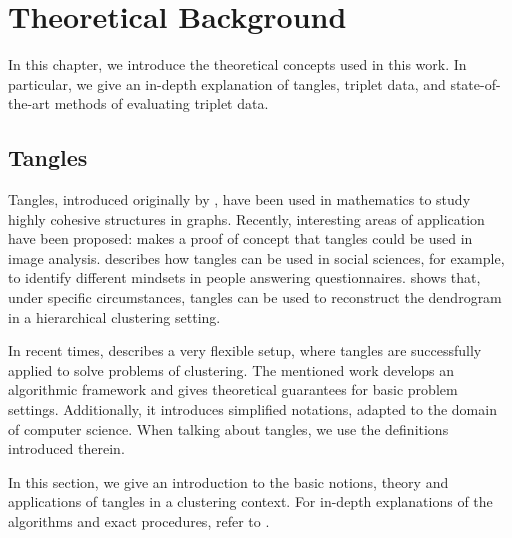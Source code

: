 \chapter{Theoretical Background}\label{theory}
In this chapter, we introduce the theoretical concepts used in this work. 
In particular, we give an in-depth explanation of tangles, triplet data, and state-of-the-art methods of evaluating triplet data.

\section{Tangles}\label{theory:tangles}
Tangles, introduced originally by \cite{robertsonGraphMinorsObstructions1991}, have been used in mathematics to study highly cohesive structures in graphs.
Recently, interesting areas of application have been proposed:
\cite{diestelTanglesMonaLisa2017} makes a proof of concept that tangles could 
be used in image analysis.
\cite{diestelTanglesSocialSciences2019} describes how tangles can be used in social sciences, for 
example, to identify different mindsets in people answering questionnaires.
\cite{Fluck2019} shows that, under specific circumstances, tangles can be
used to reconstruct the dendrogram in a hierarchical clustering setting. 

In recent times, \cite{klepperClusteringTanglesAlgorithmic2021} describes a very flexible setup,
where tangles are successfully applied to solve problems of clustering. 
The mentioned work develops an algorithmic framework and gives theoretical guarantees for 
basic problem settings.
Additionally, it introduces simplified notations, adapted to the domain of computer science. 
When talking about tangles, we use the definitions introduced therein. 

In this section, we give an introduction to the basic notions, theory and applications of tangles in a clustering context.
For in-depth explanations of the algorithms and exact procedures, refer to 
\cite{klepperClusteringTanglesAlgorithmic2021}.


